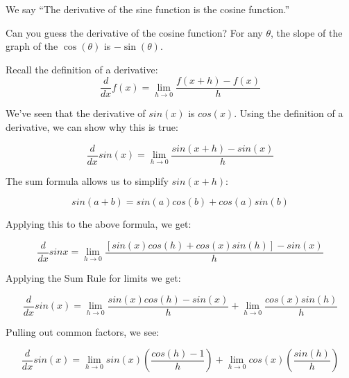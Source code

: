 
We say ``The derivative of the sine function is the cosine function.''

Can you guess the derivative of the cosine function? For any $\theta$, the slope of the graph of the $\cos(\theta)$ is $-\sin(\theta)$.

Recall the definition of a derivative: $$\frac{d}{dx}f(x)=\lim_{h \to 0}\frac{f(x+h)-f(x)}{h}$$

We've seen that the derivative of $sin(x)$ is $cos(x)$. Using the definition of a derivative, we can show why this is true:

$$\frac{d}{dx}sin(x)=\lim_{h \to 0}\frac{sin(x+h)-sin(x)}{h}$$

The sum formula allows us to simplify $sin(x+h)$:

$$sin(a+b)=sin(a)cos(b)+cos(a)sin(b)$$

Applying this to the above formula, we get:

$$\frac{d}{dx}sinx=\lim_{h \to 0}\frac{[sin(x)cos(h)+cos(x)sin(h)]-sin(x)}{h}$$

Applying the Sum Rule for limits we get:

$$\frac{d}{dx}sin(x)=\lim_{h \to 0}\frac{sin(x)cos(h)-sin(x)}{h}+\lim_{h \to 0}\frac{cos(x)sin(h)}{h}$$

Pulling out common factors, we see:

$$\frac{d}{dx}sin(x)=\lim_{h \to 0}sin(x)(\frac{cos(h)-1}{h}) + \lim_{h \to 0}cos(x)(\frac{sin(h)}{h})$$

